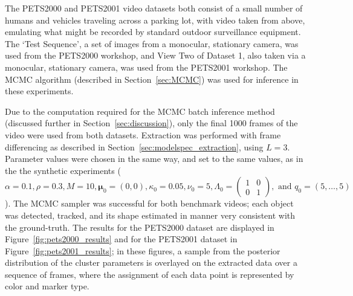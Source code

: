 \documentclass[twocolumn, final]{svjour3}
\begin{document}
The PETS2000 and PETS2001 video datasets both consist of a small number of humans and vehicles traveling across a parking lot, with video taken from above, emulating what might be recorded by standard outdoor surveillance equipment. The `Test Sequence', a set of images from a monocular, stationary camera, was used from the PETS2000 workshop, and View Two of Dataset 1, also taken via a monocular, stationary camera, was used from the PETS2001 workshop. The MCMC algorithm (described in Section~\ref{sec:MCMC}) was used for inference in these experiments.

Due to the computation required for the MCMC batch inference method (discussed further in Section~\ref{sec:discussion}), only the final 1000 frames of the video were used from both datasets. Extraction was performed with frame differencing as described in Section~\ref{sec:modelspec_extraction}, using $L=3$. Parameter values were chosen in the same way, and set to the same values, as in the the synthetic experiments ($\alpha = 0.1, \rho = 0.3, M = 10, \boldsymbol{\mu}_{0} = (0,0), \kappa_{0} = 0.05, \nu_{0} = 5, \Lambda_{0} = \left( \begin{smallmatrix} 1&0\\ 0&1 \end{smallmatrix} \right), \text{ and } q_{0} = (5, \ldots, 5)$). The MCMC sampler was successful for both benchmark videos; each object was detected, tracked, and its shape estimated in manner very consistent with the ground-truth. The results for the PETS2000 dataset are displayed in Figure~\ref{fig:pets2000_results} and for the PETS2001 dataset in Figure~\ref{fig:pets2001_results}; in these figures, a sample from the posterior distribution of the cluster parameters is overlayed on the extracted data over a sequence of frames, where the assignment of each data point is represented by color and marker type.
\end{document}
